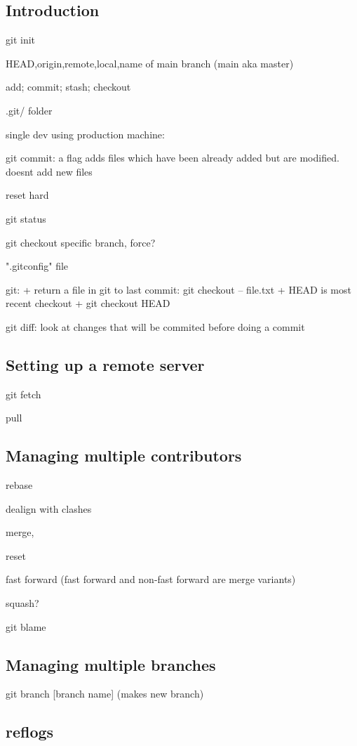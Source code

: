 
\subsection{Introduction}

git init

HEAD,origin,remote,local,name of main branch (main aka master)

add; commit; stash; checkout

.git/ folder

single dev using production machine:

git commit: a flag adds files which have been already added but are modified. doesnt add new files

reset hard

git status

git checkout specific branch, force?

".gitconfig" file

git:
+ return a file in git to last commit: git checkout -- file.txt
+ HEAD is most recent checkout
+ git checkout HEAD

git diff: look at changes that will be commited before doing a commit
\subsection{Setting up a remote server}

git fetch

pull

\subsection{Managing multiple contributors}

rebase

dealign with clashes

merge, 

reset

fast forward (fast forward and non-fast forward are merge variants)

squash?

git blame

\subsection{Managing multiple branches}



git branch [branch name] (makes new branch)
\subsection{reflogs}
